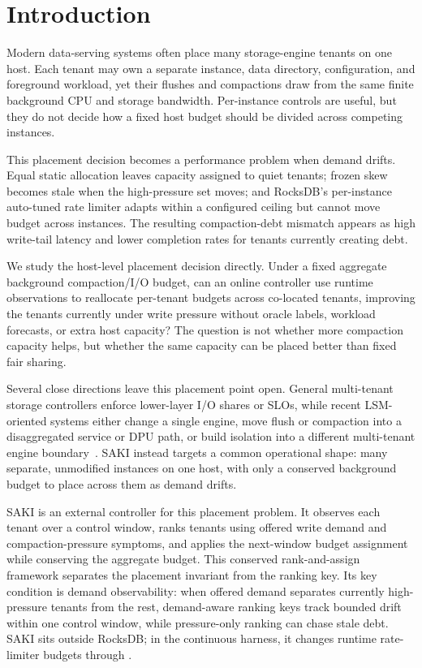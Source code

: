 \section{Introduction}

Modern data-serving systems often place many storage-engine tenants on one
host. Each tenant may own a separate \rocksdb instance, data directory,
configuration, and foreground workload, yet their flushes and compactions draw
from the same finite background CPU and storage bandwidth. Per-instance controls are
useful, but they do not decide how a fixed host budget should be divided
across competing instances.

This placement decision becomes a performance problem when demand drifts. Equal
static allocation leaves capacity assigned to quiet tenants; frozen skew becomes
stale when the high-pressure set moves; and RocksDB's per-instance auto-tuned
rate limiter adapts within a configured ceiling but cannot move budget across
instances. The resulting compaction-debt mismatch appears as high write-tail
latency and lower completion rates for tenants currently creating debt.

We study the host-level placement decision directly. Under a fixed aggregate
background compaction/I/O budget, can an online controller use runtime
observations to reallocate per-tenant budgets across co-located \rocksdb
tenants, improving the tenants currently under write pressure without oracle
labels, workload forecasts, or extra host capacity? The question is
not whether more compaction capacity helps, but whether the same capacity can
be placed better than fixed fair sharing.

Several close directions leave this placement point open. General
multi-tenant storage controllers enforce lower-layer I/O shares or SLOs, while
recent LSM-oriented systems either change a single engine, move flush or
compaction into a disaggregated service or DPU path, or build isolation into a
different multi-tenant engine boundary~\cite{gulati2010mclock,
thereska2013ioflow,yu2024caaslsm,ding2025dflush,wang2026flexengine,
griggs2026deltafairsharing}. SAKI instead targets a common operational shape:
many separate, unmodified \rocksdb instances on one host, with only a conserved
background budget to place across them as demand drifts.

SAKI is an external controller for this placement problem. It observes each
tenant over a control window, ranks tenants using offered write demand and
compaction-pressure symptoms, and applies the next-window budget assignment
while conserving the aggregate budget. This conserved rank-and-assign framework
separates the placement invariant from the ranking key. Its key condition is
demand observability: when offered demand separates currently high-pressure
tenants from the rest, demand-aware ranking keys track bounded drift within
one control window, while pressure-only ranking can chase stale debt. SAKI sits
outside RocksDB; in the continuous harness, it changes runtime rate-limiter
budgets through \ratecall.

